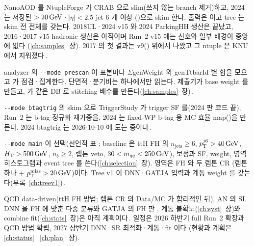 \begin{description}[leftmargin=0pt, labelsep=0.5em, itemsep=0.4ex]
  \item[입력과 생산.] NanoAOD 를 NtupleForge 가 CRAB 으로 slim(쓰지 않는 branch 제거)하고, 2024 는 저장된 $>20\,\mathrm{GeV}$·$|\eta|<2.5$ jet 6 개 이상
    ()으로 skim 한다. 출력은  이고  tree 는 skim 전 전체를 갖는다.
    2018UL·2024 v15 와 2024 ParkingHH 생산은 끝났고, 2016·2017 v15 hadronic 생산은 아직이며 Run~2 v15 에는 신호와 일부 배경이 중앙에 없다
    (\ref{ch:samples}~장). 2017 의 첫 결과는 v9() 위에서 나왔고 그 ntuple 은 KNU 에서 지워졌다\,\tagimpl.
  \item[정규화 입력.] analyzer 의 \texttt{-{}-mode prescan} 이 표본마다 $\Sigma$genWeight 와 genTtbarId 별 합을 모으고  가 점검·집계한다.
    단면적·분기비는  하나에서만 읽는다. 제출기가 base weight 를 만들고,  가 같은 DB 로
    stitching 배수를 만든다(\ref{ch:samples}~장)\,\tagimpl.
  \item[파생 보정.] \texttt{-{}-mode btagtrig} 의 skim 으로 TriggerStudy 가 trigger SF 를(2024 판 코드 끝), Run~2 는 b-tag 정규화 재가중을,
    2024 는 fixed-WP b-tag 용 MC 효율 map()을 만든다. 2024 btagtrig 는 2026-10-10 에 도는 중이다\,\tagtest.
  \item[본 분석.] \texttt{-{}-mode main} 이 선택(선언적 표 ; baseline 은 ttH FH 의 $n_{\mathrm{jets}}\geq6$, $p_{\mathrm T}^{j6}>40\,\mathrm{GeV}$, $H_{\mathrm{T}}>500\,\mathrm{GeV}$,
    $n_b\geq2$, 렙톤 veto, $30<m_{qq}<250\,\mathrm{GeV}$), 보정과 SF, weight, 영역 히스토그램과 event tree 를 쓴다(\ref{ch:selection}~장). 영역은 FH 와 두 렙톤 CR
    (렙톤 하나 + $p_{\mathrm{T}}^{\mathrm{miss}}>20\,\mathrm{GeV}$)이다. Tree v1 이 DNN·GATJA 입력과 계통 weight 를 갖는다(부록~\ref{ch:treev1})\,\tagimpl.
  \item[계획.] QCD data-driven(ttH FH 방법; 렙톤 CR 의 Data/MC 가 합리적인 뒤), AN 의 SL DNN 을 FH 에 맞춘 다중 분류와 GATJA 의 FH 판
    , 계통 불확도(\ref{ch:syst}~장)와 combine fit(\ref{ch:stats}~장)은 아직 계획이다\,\tagplan. 일정은 2026 하반기 full Run~2 확장과 QCD 방법 확립, 2027 상반기 DNN·SR 최적화·계통·fit 이다
    (현황과 계획은 \ref{ch:status}·\ref{ch:plan}~장).
\end{description}

